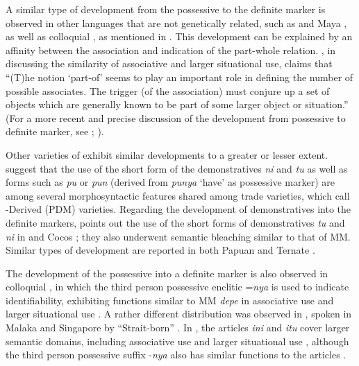 \documentclass[output=paper
,modfonts
,nonflat]{langsci/langscibook}
\begin{document}
A similar type of development from the possessive to the definite marker is observed in other languages that are not genetically related, such as  \citep{Rubin2010} and  Maya \citep[86--88]{Lehmann1998}, as well as colloquial , as mentioned in . This development can be explained by an affinity between the association and indication of the part-whole relation. \citet[123--124]{Hawkins2015}, in discussing the similarity of associative  and larger situational use, claims that “(T)he notion ‘part-of’ seems to play an important role in defining the number of possible associates. The trigger (of the association) must conjure up a set of objects which are generally known to be part of some larger object or situation.” (For a more recent and precise discussion of the development from possessive to definite marker, see \citealt{Fraund2001}; \citealt{Gerland2014, Gerland2015}).

Other varieties of  exhibit similar developments to a greater or lesser extent. \citet[675]{Adelaar1996} suggest that the use of the short form of the demonstratives \textit{ni} and \textit{tu} as well as forms such as \textit{pu} or \textit{pun} (derived from \textit{punya} ‘have’ as possessive marker) are among several morphosyntactic features shared among trade  varieties, which \citet[675]{Adelaar1996} call -Derived  (PDM) varieties. Regarding the development of demonstratives into the definite markers, \citet[212--217]{Adelaar2005} points out the  use of the short forms of demonstratives \textit{tu} and \textit{ni} in   and Cocos ; they also underwent semantic bleaching similar to that of MM. Similar types of development are reported in both Papuan  \citep[384--388]{Kluge2017} and Ternate  \citep[263, 277]{Litamahuputty2012}.

The development of the possessive into a definite marker is also observed in colloquial , in which the third person possessive enclitic =\textit{nya} is used to indicate identifiability, exhibiting functions similar to MM \textit{depe} in associative  use and larger situational use \citep[161--168]{Englebretson2003}. A rather different distribution was observed in , spoken in Malaka and Singapore by “Strait-born” . In , the articles \textit{ini} and \textit{itu} cover larger semantic domains, including associative  use and larger situational use \citep[477--480]{Thurgood2001}, although the third person possessive suffix -\textit{nya} also has similar functions to the articles \citep[132--135]{Thurgood1998}.
\end{document}
